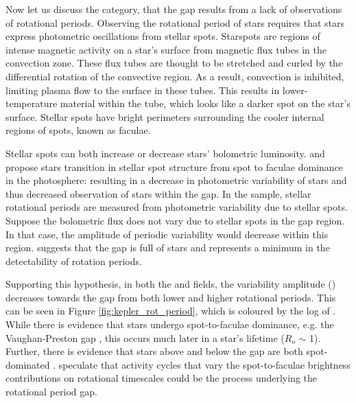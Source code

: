 Now let us discuss the  category, that the gap results from a lack of observations of rotational periods.
Observing the rotational period of \kepler{} stars requires that stars express photometric oscillations from stellar spots.
Starspots are regions of intense magnetic activity on a star's surface from magnetic flux tubes in the convection zone. 
These flux tubes are thought to be stretched and curled by the differential rotation of the convective region. 
As a result, convection is inhibited, limiting plasma flow to the surface in these tubes.
This results in lower-temperature material within the tube, which looks like a darker spot on the star's surface.
Stellar spots have bright perimeters surrounding the cooler internal regions of spots, known as faculae.

Stellar spots can both increase or decrease stars' bolometric luminosity.
 \citet{reinhold_fast_2013} and \citet{reinhold_transition_2019} propose stars transition in stellar spot structure from spot to faculae dominance in the photosphere: resulting in a decrease in photometric variability of stars and thus decreased observation of stars within the gap.
In the \citet{mcquillan_rotation_2014} sample, stellar rotational periods are measured from photometric variability due to stellar spots.
Suppose the bolometric flux does not vary due to stellar spots in the gap region. 
In that case, the amplitude of periodic variability would decrease within this region.
\citet{reinhold_transition_2019} suggests that the gap is full of stars and represents a minimum in the detectability of rotation periods.

Supporting this hypothesis, in both the \kepler{} and \ktoo{} fields, the variability amplitude (\rper) decreases towards the gap from both lower and higher rotational periods.
This can be seen in Figure \ref{fig:kepler_rot_period}, which is coloured by the log of \rper.
While there is evidence that stars undergo spot-to-faculae dominance, e.g. the Vaughan-Preston gap \citep{vaughan_survey_1980}, this occurs much later in a star's lifetime ($R_o$ $\sim$ 1).
Further, there is evidence that stars above and below the gap are both spot-dominated  \citep{lockwood_patterns_2007, reinhold_transition_2019}.
\citet{reinhold_transition_2019} speculate that activity cycles that vary the spot-to-faculae brightness contributions on rotational timescales could be the process underlying the rotational period gap.

